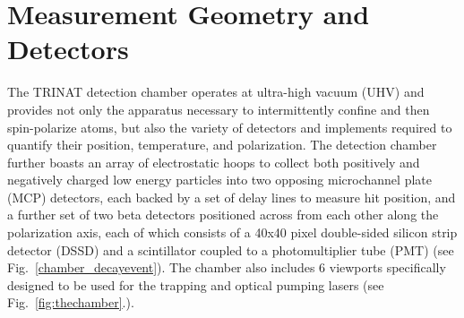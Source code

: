 \section{Measurement Geometry and Detectors}
\label{sec:geometry}
The TRINAT detection chamber operates at ultra-high vacuum (UHV) and provides not only the apparatus necessary to intermittently confine and then spin-polarize atoms, but also the variety of detectors and implements required to quantify their position, temperature, and polarization.  The detection chamber further boasts an array of electrostatic hoops to collect both positively and negatively charged low energy particles into two opposing microchannel plate (MCP) detectors, each backed by a set of delay lines to measure hit position, and a further set of two beta detectors positioned across from each other along the polarization axis, each of which consists of a 40x40 pixel double-sided silicon strip detector (DSSD) and a scintillator coupled to a photomultiplier tube (PMT) 
(see Fig.~\ref{chamber_decayevent}). The chamber also includes 6 viewports specifically designed to be used for the trapping and optical pumping lasers (see Fig.~\ref{fig:thechamber}.).



